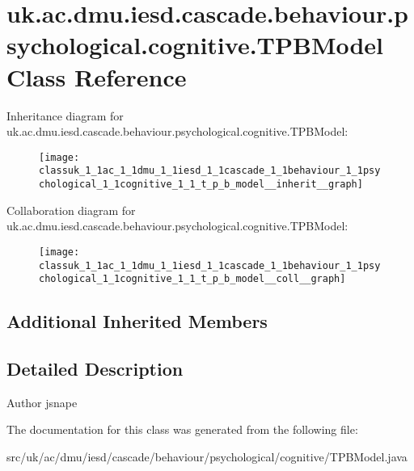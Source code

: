 \hypertarget{classuk_1_1ac_1_1dmu_1_1iesd_1_1cascade_1_1behaviour_1_1psychological_1_1cognitive_1_1_t_p_b_model}{\section{uk.\-ac.\-dmu.\-iesd.\-cascade.\-behaviour.\-psychological.\-cognitive.\-T\-P\-B\-Model Class Reference}
\label{classuk_1_1ac_1_1dmu_1_1iesd_1_1cascade_1_1behaviour_1_1psychological_1_1cognitive_1_1_t_p_b_model}
}


Inheritance diagram for uk.\-ac.\-dmu.\-iesd.\-cascade.\-behaviour.\-psychological.\-cognitive.\-T\-P\-B\-Model\-:\nopagebreak
\begin{figure}[H]
\begin{center}
\leavevmode
\texttt{[image: classuk\_1\_1ac\_1\_1dmu\_1\_1iesd\_1\_1cascade\_1\_1behaviour\_1\_1psychological\_1\_1cognitive\_1\_1\_t\_p\_b\_model\_\_inherit\_\_graph]}
\end{center}
\end{figure}


Collaboration diagram for uk.\-ac.\-dmu.\-iesd.\-cascade.\-behaviour.\-psychological.\-cognitive.\-T\-P\-B\-Model\-:\nopagebreak
\begin{figure}[H]
\begin{center}
\leavevmode
\texttt{[image: classuk\_1\_1ac\_1\_1dmu\_1\_1iesd\_1\_1cascade\_1\_1behaviour\_1\_1psychological\_1\_1cognitive\_1\_1\_t\_p\_b\_model\_\_coll\_\_graph]}
\end{center}
\end{figure}
\subsection*{Additional Inherited Members}


\subsection{Detailed Description}
\begin{DoxyAuthor}{Author}
jsnape 
\end{DoxyAuthor}


The documentation for this class was generated from the following file\-:\begin{DoxyCompactItemize}
\item 
src/uk/ac/dmu/iesd/cascade/behaviour/psychological/cognitive/T\-P\-B\-Model.\-java\end{DoxyCompactItemize}
